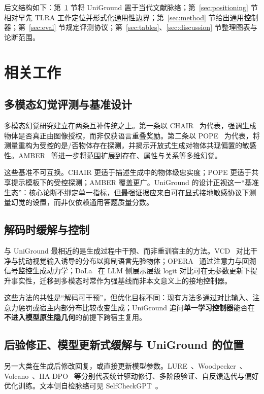 后文结构如下：第~\ref{sec:related} 节将 UniGround 置于当代文献脉络；第~\ref{sec:positioning} 节相对早先 TLRA 工作定位并形式化通用性边界；第~\ref{sec:method} 节给出通用控制器；第~\ref{sec:eval} 节规定评测协议；第~\ref{sec:tables}、\ref{sec:discussion} 节整理图表与论断范围。

\section{相关工作}
\label{sec:related}

\subsection{多模态幻觉评测与基准设计}

多模态幻觉研究建立在两条互补传统之上。第一条以 CHAIR~\cite{rohrbach2018chair} 为代表，强调生成物体是否真正由图像授权，而非仅获语言重叠奖励。第二条以 POPE~\cite{li2023pope} 为代表，将测量重构为受控的是/否物体存在探测，并揭示开放式生成对物体共现偏置的敏感性。AMBER~\cite{wang2023amber} 等进一步将范围扩展到存在、属性与关系等多维幻觉。

这些基准不可互换。CHAIR 更适于描述生成中的物体级忠实度；POPE 更适于共享提示模板下的受控探测；AMBER 覆盖更广。UniGround 的设计正视这一“基准生态”：核心论断不绑定单一指标，但最强证据应来自可在显式接地敏感协议下测量幻觉的设置，而非仅依赖通用答题质量分数。

\subsection{解码时缓解与控制}

与 UniGround 最相近的是生成过程中干预、而非重训宿主的方法。VCD~\cite{leng2024vcd} 对比干净与扰动视觉输入诱导的分布以抑制语言先验物体；OPERA~\cite{huang2024opera} 通过注意力与回溯信号监控生成动力学；DoLa~\cite{chuang2024dola} 在 LLM 侧展示层级 logit 对比可在无参数更新下提升事实性，迁移到多模态时常作为强基线而非本文意义上的接地控制器。

这些方法的共性是“解码可干预”，但优化目标不同：现有方法多通过对比输入、注意力惩罚或宿主内部分布比较改变生成；UniGround 追问\textbf{单一学习控制器}能否在\textbf{不进入模型原生隐几何}的前提下跨宿主复用。

\subsection{后验修正、模型更新式缓解与 UniGround 的位置}

另一大类在生成后修改回复，或直接更新模型参数。LURE~\cite{zhou2024lure}、Woodpecker~\cite{yin2023woodpecker}、Volcano~\cite{lee2024volcano}、HA-DPO~\cite{zhao2023hadpo} 等分别代表统计驱动修订、多阶段验证、自反馈迭代与偏好优化训练。文本侧自检脉络可见 SelfCheckGPT~\cite{manakul2023selfcheckgpt}。

